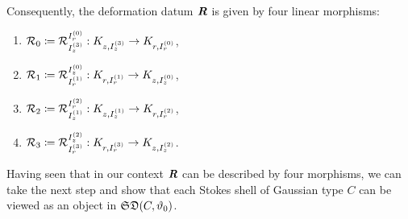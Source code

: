 Consequently, the deformation datum $\bm{\mathit{R}}$ is given by four linear morphisms:
    \begin{multicols}{2} %
    \begin{enumerate}
        \item $\mathcal{R}_0 \coloneqq \mathcal{R}_{I_z^{(3)}}^{I_r^{(0)}}:K_{z,I_z^{(3)}} \to K_{r,I_r^{(0)}}$,
        \item $\mathcal{R}_1 \coloneqq \mathcal{R}_{I_r^{(1)}}^{I_z^{(0)}}: K_{r, I_r^{(1)}} \to K_{z,I_z^{(0)}}$,
        \item $\mathcal{R}_2 \coloneqq \mathcal{R}_{I_z^{(1)}}^{I_r^{(2)}}: K_{z,I_z^{(1)}} \to K_{r,I_r^{(2)}}$,
        \item $\mathcal{R}_3 \coloneqq \mathcal{R}_{I_r^{(3)}}^{I_z^{(2)}}: K_{r, I_r^{(3)}} \to K_{z,I_z^{(2)}}$. 
    \end{enumerate}
    \end{multicols}

    
\begin{comment}
\begin{rem}
    Ist ein Morphismus $\Rc_{I_1}^{I_2}$ mit $I_1 = I_r^{(\nu_r)}$; $I_2 =I_z^{(\nu_z)}$ aus $\Defo$ nicht trivial, dann gilt $r \geq_\theta z$ für alle $\theta \in I_1 \cap I_2$, denn für $\theta \in I_1$ gilt $r \geq_\theta 0 $ und für $\theta \in I_2$ gilt $0 \geq_\theta z$. Analog natürlich für $I_1 = I_z^\bullet$, $I_2 = I_r^\bullet$.
\end{rem}
\end{comment}

Having seen that in our context $\bm{\mathit{R}}$ can be described by four morphisms, we can take the next step and show that each Stokes shell of Gaussian type $C$ can be viewed as an object in $\mathfrak{SD}(C,\vartheta_0)$. 

